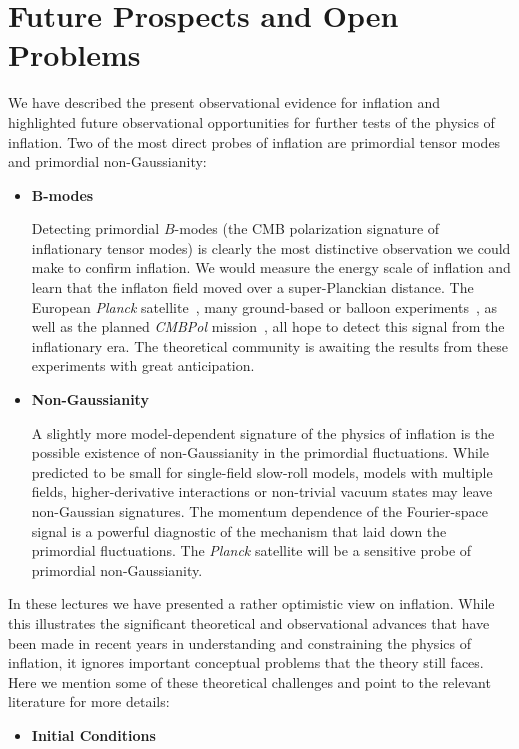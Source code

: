 \documentclass[12pt,letterpaper,rotate]{article}
\begin{document}
{\section{Future Prospects and Open Problems}
\label{sec:conclusion}

We have described the present observational evidence for inflation and highlighted future observational opportunities for further tests of the physics of inflation.
Two of the most direct probes of inflation are primordial tensor modes and primordial non-Gaussianity:
\begin{itemize}
\item {\bf B-modes}

Detecting primordial $B$-modes (the CMB polarization signature of inflationary tensor modes) is clearly the most distinctive observation we could make to confirm inflation. We would measure the energy scale of inflation and learn that the inflaton field moved over a super-Planckian distance.
The European {\sl Planck} satellite~\cite{:2006uk}, many ground-based or balloon experiments~\cite{CMBPolWorkshop, Kosowsky:2004sw, Ruhl:2004kv, Taylor:2006jw, Samtleben:2008rb, Yoon:2006jc, Oxley:2005dg, MacTavish:2007kh}, as well as the planned {\sl CMBPol} mission~\cite{WhitePaper, Bock:2009xw}, all hope to detect this signal from the inflationary era. The theoretical community is awaiting the results from these experiments with great anticipation.

\item {\bf Non-Gaussianity}

A slightly more model-dependent signature of the physics of inflation is the possible existence of non-Gaussianity in the primordial fluctuations. While predicted to be small for single-field slow-roll models, models with multiple fields, higher-derivative interactions or non-trivial vacuum states may leave non-Gaussian signatures. The momentum dependence of the Fourier-space signal is a powerful diagnostic of the mechanism that laid down the primordial fluctuations.  The {\sl Planck} satellite will be a sensitive probe of primordial non-Gaussianity.
\end{itemize}

In these lectures we have presented a rather optimistic view on inflation. 
While this illustrates the significant theoretical and observational advances that have been made in recent years in understanding and constraining the physics of inflation, it ignores important conceptual problems that the theory still faces. Here we mention some of these theoretical challenges and point to the relevant literature for more details:
\begin{itemize}
\item {\bf Initial Conditions}


\end{itemize}}
\end{document}
